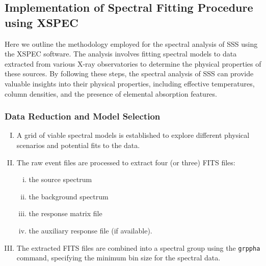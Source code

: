 		\subsection{Implementation of Spectral Fitting Procedure using XSPEC}
			Here we outline the methodology employed for the spectral analysis of SSS using the XSPEC software. The analysis involves fitting spectral models to data extracted from various X-ray observatories to determine the physical properties of these sources. By following these steps, the spectral analysis of SSS can provide valuable insights into their physical properties, including effective temperatures, column densities, and the presence of elemental absorption features.
			
			\subsubsection{Data Reduction and Model Selection}
				\begin{enumerate}[I.]
					\item A grid of viable spectral models is established to explore different physical scenarios and potential fits to the data.
					\item The raw event files are processed to extract four (or three) FITS files:
					\begin{enumerate}[i.]
						\item the source spectrum
						\item the background spectrum
						\item the response matrix file
						\item the auxiliary response file (if available).
					\end{enumerate}
					\item The extracted FITS files are combined into a spectral group using the \texttt{grppha} command, specifying the minimum bin size for the spectral data.
				\end{enumerate}
			
